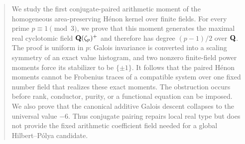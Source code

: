 \begin{abstract}
We study the first conjugate-paired arithmetic moment of the homogeneous
area-preserving H\'enon kernel over finite fields.  For every prime
$p\equiv1\pmod 3$, we prove that this moment generates the maximal real
cyclotomic field $\Q(\zeta_p)^+$ and therefore has degree $(p-1)/2$ over
$\Q$.  The proof is uniform in $p$: Galois invariance is converted into a
scaling symmetry of an exact value histogram, and two nonzero finite-field
power moments force its stabilizer to be $\{\pm1\}$.  It follows that the
paired H\'enon moments cannot be Frobenius traces of a compatible system over
one fixed number field that realizes these exact moments.  The obstruction
occurs before rank, conductor, purity, or a functional equation can be
imposed.  We also prove that the
canonical additive Galois descent collapses to the universal value $-6$.
Thus conjugate pairing repairs local real type but does not provide the fixed
arithmetic coefficient field needed for a global Hilbert--P\'olya candidate.
\end{abstract}
